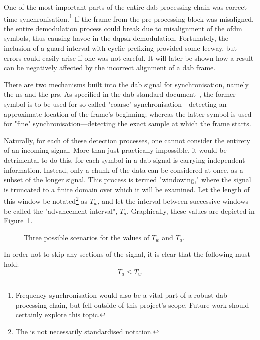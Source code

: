 \documentclass[class=report,11pt,crop=false]{standalone}
\begin{document}
One of the most important parts of the entire \gls{dab} processing chain was correct time-synchronisation.\footnote{Frequency synchronisation would also be a vital part of a robust \gls{dab} processing chain, but fell outside of this project's scope. Future work should certainly explore this topic.} If the frame from the pre-processing block was misaligned, the entire demodulation process could break due to misalignment of the \gls{ofdm} symbols, thus causing havoc in the \gls{dqpsk} demodulation. Fortunately, the inclusion of a guard interval with cyclic prefixing provided some leeway, but errors could easily arise if one was not careful. It will later be shown how a result can be negatively affected by the incorrect alignment of a \gls{dab} frame.

There are two mechanisms built into the \gls{dab} signal for synchronisation, namely the \gls{ns} and the \gls{prs}. As specified in the \gls{dab} standard document~\cite{dabstandard}, the former symbol is to be used for so-called "coarse" synchronisation---detecting an approximate location of the frame's beginning; whereas the latter symbol is used for "fine" synchronisation---detecting the exact sample at which the frame starts. 

Naturally, for each of these detection processes, one cannot consider the entirety of an incoming signal. More than just practically impossible, it would be detrimental to do this, for each symbol in a \gls{dab} signal is carrying independent information. Instead, only a chunk of the data can be considered at once, as a subset of the longer signal. This process is termed "windowing," where the signal is truncated to a finite domain over which it will be examined. Let the length of this window be notated\footnote{The is not necessarily standardised notation.} as \(T_w\), and let the interval between successive windows be called the "advancement interval", \(T_a\). Graphically, these values are depicted in Figure~\ref{fig:window_advance_illustration}.

\begin{figure}[htbp]
  \centering
  \captionsetup{type=figure}
  \def\svgwidth{\linewidth}
  { %
      }
      \caption{Three possible scenarios for the values of \(T_w\) and \(T_a\).}
      \label{fig:window_advance_illustration}
\end{figure}

In order not to skip any sections of the signal, it is clear that the following must hold:
\begin{equation}
  T_a \le T_w
\end{equation}
\end{document}
